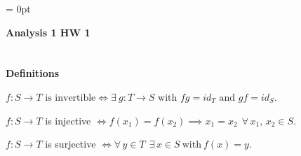 \documentclass[12pt]{article}
\begin{document}
\renewcommand{\thesection}{Exercise \arabic{section}}
\parindent = 0pt


      {\bf Analysis 1 HW 1}  \hfill 



\section{}
 {\bf Definitions}


$f: S \rightarrow T \text{ is invertible} \Longleftrightarrow \exists ~g: T \rightarrow S \text{ with } fg = id_T \text{ and } gf = id_S$.


$f:S \rightarrow T$ is injective $\Longleftrightarrow f(x_1) = f(x_2) \implies x_1 = x_2 \ \ \forall \, x_1, \, x_2 \in S$.

$f:S \rightarrow T$ is surjective $\Longleftrightarrow \forall \, y \in T \ \ \exists \, x\in S  \  \text{with}  \  f(x) = y$.
\end{document}
